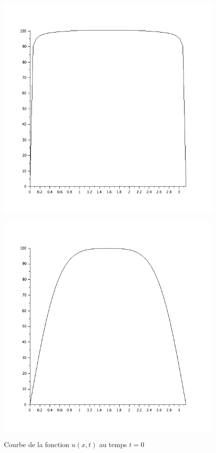 \documentclass[a4paper,12pt]{report}
\begin{document}
\begin{figure}[h!]
   \begin{minipage}[b]{0.40\linewidth}
      \includegraphics[scale=0.3]{ex5_fig1.png}\\
	  \caption{Courbe  de la fonction $u(x,t)$ au temps $t=0$}
   \end{minipage}\hfill
   \begin{minipage}[b]{0.48\linewidth}   
      \includegraphics[scale=0.3]{ex5_fig3.png}\\

\end{minipage}
\end{figure}
\end{document}
